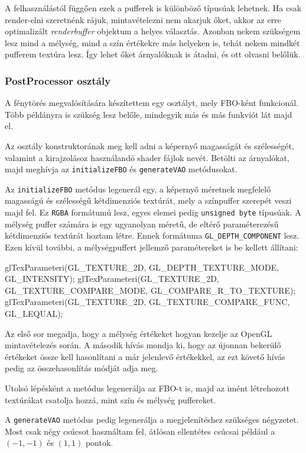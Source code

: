 A felhasználástól függően ezek a pufferek is különböző típusúak lehetnek. Ha csak render-elni szeretnénk rájuk, mintavételezni nem akarjuk őket, akkor az erre optimalizált \textit{renderbuffer} objektum a helyes választás. Azonban nekem szükségem lesz mind a mélység, mind a szín értékekre más helyeken is, tehát nekem mindkét pufferem textúra lesz. Így lehet őket árnyalóknak is átadni, és ott olvasni belőlük. 

\subsubsection{PostProcessor osztály}
A fénytörés megvalósítására készítettem egy osztályt, mely FBO-ként funkcionál. Több példányra is szükség lesz belőle, mindegyik más és más funkviót lát majd el.

Az osztály konstruktorának meg kell adni a képernyő magasságát és szélességét, valamint a kirajzolásoz használandó shader fájlok nevét. Betölti az árnyalókat, majd meghívja az \texttt{initializeFBO} és \texttt{generateVAO} metódusokat.

Az \texttt{initializeFBO} metódus legenerál egy, a képernyő méretnek megfelelő magasságú és szélességű kétdimenziós textúrát, mely a színpuffer szerepét veszi majd fel. Ez \texttt{RGBA} formátumú lesz, egyes elemei pedig \texttt{unsigned byte} típusúak. A mélység puffer számára is egy ugyanolyan méretű, de eltérő paraméterezésű kétdimenziós textúrát hoztam létre. Ennek formátuma \texttt{GL\_DEPTH\_COMPONENT} lesz. Ezen kívül további, a mélységpuffert jellemző paramétereket is be kellett állítani:
\begin{cpp}
glTexParameteri(GL_TEXTURE_2D, GL_DEPTH_TEXTURE_MODE, GL_INTENSITY);
glTexParameteri(GL_TEXTURE_2D, GL_TEXTURE_COMPARE_MODE, GL_COMPARE_R_TO_TEXTURE);
glTexParameteri(GL_TEXTURE_2D, GL_TEXTURE_COMPARE_FUNC, GL_LEQUAL);
\end{cpp}
Az első sor megadja, hogy a mélység értékeket hogyan kezelje az OpenGL mintavételezés során. A második hívás mondja ki, hogy az újonnan bekerülő értékeket össze kell hasonlítani a már jelenlevő értékekkel, az ezt követő hívás pedig az összehasonlítás módját adja meg.

Utolsó lépésként a metódus legenerálja az FBO-t is, majd az imént létrehozott textúrákat csatolja hozzá, mint szín és mélység puffereket.

A \texttt{generateVAO} metódus pedig legenerálja a megjelenítéshez szükséges négyzetet. Most csak négy csúcsot használtam fel, átlósan ellentétes csúcsai például a $(-1, -1)$ és $(1, 1)$ pontok.

